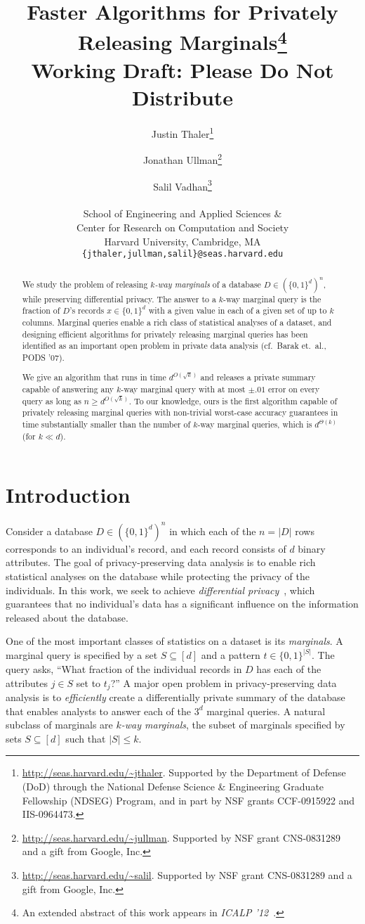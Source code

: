 \documentclass[11pt]{article}
\title{Faster Algorithms for Privately \\ Releasing Marginals\thanks{An extended abstract of this work appears in \emph{ICALP '12}~\cite{ThalerUlVa12}.} \ifnum\final=0 \\
{\small \sc Working Draft: Please Do Not Distribute}\fi}
\author{Justin Thaler\thanks{\url{http://seas.harvard.edu/\~jthaler}. Supported by the Department of Defense (DoD) through the National
Defense Science \& Engineering Graduate Fellowship (NDSEG) Program,
and in part by NSF grants CCF-0915922 and IIS-0964473.}
 \and Jonathan Ullman\thanks{
\url{http://seas.harvard.edu/\~jullman}.  Supported by NSF grant CNS-0831289 and a gift from Google, Inc.}
 \and Salil Vadhan\thanks{
\url{http://seas.harvard.edu/\~salil}.  Supported by NSF grant CNS-0831289 and a gift from Google, Inc.}
\\ \\ School of Engineering and Applied Sciences \&\\ Center for Research on Computation and Society\\ Harvard University, Cambridge, MA \\ \texttt{\{jthaler,jullman,salil\}@seas.harvard.edu}}
\newcommand\bits{\{0,1\}}
\theoremstyle{definition}
\begin{document}
\maketitle
\begin{abstract}
We study the problem of releasing \emph{$k$-way marginals} of a database $D \in (\bits^d)^n$, while preserving differential privacy.  The answer to a $k$-way marginal query is the fraction of $D$'s records $x \in \bits^d$ with a given value in each of a given set of up to $k$ columns.  Marginal queries enable a rich class of statistical analyses of a dataset, and designing efficient algorithms for privately releasing marginal queries has been identified as an important open problem in private data analysis (cf.~Barak et.~al., PODS '07).

We give an algorithm that runs in time $d^{O(\sqrt{k})}$ and releases a private summary capable of answering any $k$-way marginal query with at most $\pm .01$ error on every query as long as $n \geq d^{O(\sqrt{k})}$.  To our knowledge, ours is the first algorithm capable of privately releasing marginal queries with non-trivial worst-case accuracy guarantees in time substantially smaller than the number of $k$-way marginal queries, which is $d^{\Theta(k)}$ (for $k \ll d$).
\end{abstract}

\section{Introduction}
Consider a database $D \in (\bits^d)^n$ in which each of the $n = |D|$ rows corresponds to an individual's record, and each record consists of $d$ binary attributes.  The goal of privacy-preserving data analysis is to enable rich statistical analyses on the database while protecting the privacy of the individuals.  In this work, we seek to achieve \emph{differential privacy}~\cite{DworkMcNiSm06}, which guarantees that no individual's data has a significant influence on the information released about the database.

One of the most important classes of statistics on a dataset is its \emph{marginals}.  A marginal query is specified by a set $S \subseteq [d]$ and a pattern $t \in \bits^{|S|}$. The query asks, ``What fraction of the individual records in $D$ has each of the attributes $j \in S$ set to $t_j$?''  A major open problem in privacy-preserving data analysis is to \emph{efficiently} create a differentially private summary of the database that enables analysts to answer each of the $3^{d}$ marginal queries.  A natural subclass of marginals are \emph{$k$-way marginals}, the subset of marginals specified by sets $S \subseteq [d]$ such that $|S| \leq k$.
\end{document}
